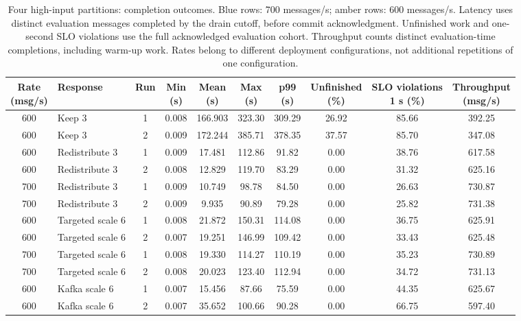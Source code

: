 \begin{table}[!htbp]
\centering\footnotesize
\setlength{\tabcolsep}{2.5pt}
\renewcommand{\arraystretch}{1.12}
\begin{tabular}{@{}clcccccccc@{}}
\toprule
\rowcolor[HTML]{DDE3EA}
\shortstack{Rate\\(msg/s)} & Response & Run & \shortstack{Min\\(s)} & \shortstack{Mean\\(s)} & \shortstack{Max\\(s)} & \shortstack{p99\\(s)} & \shortstack{Unfinished\\(\%)} & \shortstack{SLO violations\\1 s (\%)} & \shortstack{Throughput\\(msg/s)}\\
\midrule
\rowcolor[HTML]{FFE1AD}
600 & Keep 3 & 1 & 0.008 & 166.903 & 323.30 & 309.29 & 26.92 & 85.66 & 392.25\\
\rowcolor[HTML]{FFE1AD}
600 & Keep 3 & 2 & 0.009 & 172.244 & 385.71 & 378.35 & 37.57 & 85.70 & 347.08\\
\rowcolor[HTML]{FFE1AD}
600 & Redistribute 3 & 1 & 0.009 & 17.481 & 112.86 & 91.82 & 0.00 & 38.76 & 617.58\\
\rowcolor[HTML]{FFE1AD}
600 & Redistribute 3 & 2 & 0.008 & 12.829 & 119.70 & 83.29 & 0.00 & 31.32 & 625.16\\
\rowcolor[HTML]{CFE2F3}
700 & Redistribute 3 & 1 & 0.009 & 10.749 & 98.78 & 84.50 & 0.00 & 26.63 & 730.87\\
\rowcolor[HTML]{CFE2F3}
700 & Redistribute 3 & 2 & 0.009 & 9.935 & 90.89 & 79.28 & 0.00 & 25.82 & 731.38\\
\rowcolor[HTML]{FFE1AD}
600 & Targeted scale 6 & 1 & 0.008 & 21.872 & 150.31 & 114.08 & 0.00 & 36.75 & 625.91\\
\rowcolor[HTML]{FFE1AD}
600 & Targeted scale 6 & 2 & 0.007 & 19.251 & 146.99 & 109.42 & 0.00 & 33.43 & 625.48\\
\rowcolor[HTML]{CFE2F3}
700 & Targeted scale 6 & 1 & 0.008 & 19.330 & 114.27 & 110.19 & 0.00 & 35.23 & 730.89\\
\rowcolor[HTML]{CFE2F3}
700 & Targeted scale 6 & 2 & 0.008 & 20.023 & 123.40 & 112.94 & 0.00 & 34.72 & 731.13\\
\rowcolor[HTML]{FFE1AD}
600 & Kafka scale 6 & 1 & 0.007 & 15.456 & 87.66 & 75.59 & 0.00 & 44.35 & 625.67\\
\rowcolor[HTML]{FFE1AD}
600 & Kafka scale 6 & 2 & 0.007 & 35.652 & 100.66 & 90.28 & 0.00 & 66.75 & 597.40\\
\bottomrule
\end{tabular}
\caption{Four high-input partitions: completion outcomes. Blue rows: 700 messages/s; amber rows: 600 messages/s. Latency uses distinct evaluation messages completed by the drain cutoff, before commit acknowledgment. Unfinished work and one-second SLO violations use the full acknowledged evaluation cohort. Throughput counts distinct evaluation-time completions, including warm-up work. Rates belong to different deployment configurations, not additional repetitions of one configuration.}
\label{tab:four-partition-outcomes}\label{tab:four-partition-latency-details}
\end{table}

